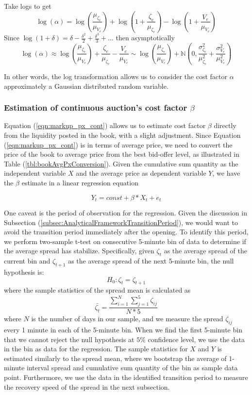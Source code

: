 Take logs to get
\[\log(\alpha) = \log \left(\frac{\mu_{\zeta_e}}{\mu_{V_e}} \right)
  + \log \left( 1+ \frac{\zeta_e}{\mu_{\zeta_e}} \right)
  - \log \left( 1+ \frac{V_e}{\mu_{V_e}} \right)
\]
Since $\log(1+\delta) = \delta - \frac{\delta^2}{2} + \frac{\delta^3}{3} + \dots $
then asymptotically
\[ \log(\alpha) \approx \log \left(\frac{\mu_{\zeta_e}}{\mu_{V_e}} \right)+ \frac{\zeta_e}{\mu_{\zeta_e}}  -
  \frac{V_e}{\mu_{V_e}}
  \sim \log \left(\frac{\mu_{\zeta_e}}{\mu_{V_e}} \right) + \mathbb{N} \left( 0, \frac{\sigma_{\zeta_e}^2}{\mu_{\zeta_e}^2} + \frac{\sigma_{V_e}^2}{\mu_{V_e}^2} \right)
\]

In other words, the log transformation allows us to consider the cost factor $\alpha$ approximately a Gaussian distributed random variable.

\subsubsection{Estimation of continuous auction's cost factor $\beta$}

Equation (\ref{eqn:markup_px_cont}) allows us to estimate cost factor $\beta$ directly from the liquidity posted in the book, with a slight adjustment. Since Equation (\ref{eqn:markup_px_cont}) is in terms of average price, we need to convert the price of the book to average price from the best bid-offer level, as illustrated in Table (\ref{tbl:bookAvgPxConversion}). Given the cumulative sum quantity as the independent variable $X$ and the average price as dependent variable $Y$, we have the $\beta$ estimate in a linear regression equation

\[
  Y_t = const + \beta * X_t + e_t
\]

One caveat is the period of observation for the regression. Given the discussion in Subsection (\ref{subsec:AnalyticalFrameworkTransitionPeriod}), we would want to avoid the transition period immediately after the opening. To identify this period, we perform two-sample t-test on consecutive 5-minute bin of data to determine if the average spread has stabilize. Specifically, given $\zeta_t$ as the average spread of the current bin and $\zeta_{t+1}$ as the average spread of the next 5-minute bin, the null hypothesis is:
\[
  H_0: \zeta_t = \zeta_{t+1}
\]
where the sample statistics of the spread mean is calculated as
\[
  \bar{\zeta_t} = \frac{\sum_{i=1}^N  \sum_{j=1}^5 \zeta_{ij}}{N*5}
\]
where $N$ is the number of days in our sample, and we measure the spread $\zeta_{ij}$ every 1 minute in each of the 5-minute bin. When we find the first 5-minute bin that we cannot reject the null hypothesis at $5 \%$ confidence level, we use the data in the bin as data for the regression. The sample statistics for $X$ and $Y$ is estimated similarly to the spread mean, where we bootstrap the average of 1-minute interval spread and cumulative sum quantity of the bin as sample data point. Furthermore, we use the data in the identified transition period to measure the recovery speed of the spread in the next subsection.

